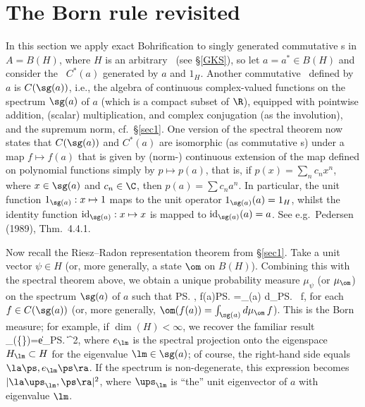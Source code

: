 \documentclass[12pt]{article}
\begin{document}
  \section{The Born rule revisited}\label{Born}
  In this section we apply exact Bohrification to singly generated  commutative \ca s in $A=B(H)$, where $H$ is an arbitrary \Hs\ (see \S\ref{GKS}), so let  $a=a^*\in B(H)$ and consider the \ca\ $C^*(a)$ generated by $a$ and $1_H$. 
   Another commutative \ca\ defined by $a$ is $ C(\sg(a))$, i.e., the algebra of continuous complex-valued functions on the spectrum $\sg(a)$ of $a$ (which is a compact subset of $\R$), equipped with pointwise addition, (scalar)  multiplication, and complex conjugation (as the involution), and the supremum norm, cf.\ \S\ref{sec1}. 
  One version of the spectral theorem now states that $C(\sg(a))$ and $C^*(a)$ are isomorphic (as
  commutative  \ca s) under a map $f\mapsto f(a)$ that  is given by (norm-) continuous extension of the map
  defined on polynomial functions simply by $p\mapsto p(a)$, that is, if $p(x)=
\sum_n c_n x^n$,  where $x\in \sg(a)$ and $c_n\in \C$, then $p(a)= \sum c_n a^n$. In particular, 
 the unit function $1_{\sg(a)}:x\mapsto 1$ maps to  the unit operator $1_{\sg(a)}(a)=1_H$, whilst 
 the identity function $\mathrm{id}_{\sg(a)}:x\mapsto x$ is mapped to  $\mathrm{id}_{\sg(a)}(a)=a$. See e.g.\ Pedersen (1989), Thm.\ 4.4.1. 
 
Now recall the Riesz--Radon representation theorem from \S\ref{sec1}.
Take a unit vector $\psi\in H$ (or, more generally,   a state $\om$ on $B(H)$). Combining this with the spectral theorem  above, we obtain a  unique probability measure $\mu_{\psi}$ (or $\mu_{\om}$)
 on the spectrum $\sg(a)$ of $a$ such that
 \beq
 \la\ps, f(a)\ps\ra=\int_{\sg(a)} d\mu_{\ps}\, f,
 \eeq for each $f\in C(\sg(a))$ (or, more generally, $\om(f(a))=\int_{\sg(a)} d\mu_{\om}\, f$). This is the Born measure; for example, if $\dim(H)<\infty$, we recover the familiar result 
 \beq
 \mu_{\psi}(\{\lm\})=\| e_{\lm}\ps\|^2, \label{Born1}
 \eeq where $e_{\lm}$ is the spectral projection onto the eigenspace $H_{\lm}\subset H$ for the eigenvalue $\lm\in\sg(a)$; of course, the right-hand side equals $\la\ps,e_{\lm}\ps\ra$. 
 If the spectrum is non-degenerate, this expression becomes $|\la\ups_{\lm},\ps\ra|^2$, where $\ups_{\lm}$ is ``the'' unit eigenvector of $a$ with eigenvalue $\lm$. 
  
\end{document}
